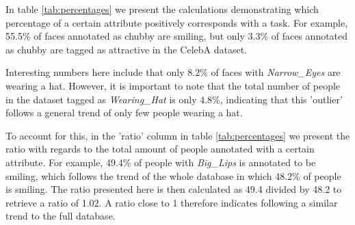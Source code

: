 In table \ref{tab:percentages} we present the calculations demonstrating which percentage of a certain attribute positively corresponds with a task. For example, 55.5\% of faces annotated as chubby are smiling, but only 3.3\% of faces annotated as chubby are tagged as attractive in the CelebA dataset. \newline

Interesting numbers here include that only 8.2\% of faces with \textit{Narrow\_Eyes} are wearing a hat. However, it is important to note that the total number of people in the dataset tagged as \textit{Wearing\_Hat} is only 4.8\%, indicating that this 'outlier' follows a general trend of only few people wearing a hat. \newline

To account for this, in the 'ratio' column in table \ref{tab:percentages} we present the ratio with regards to the total amount of people annotated with a certain attribute. For example, 49.4\% of people with \textit{Big\_Lips} is annotated to be smiling, which follows the trend of the whole database in which 48.2\% of people is smiling. The ratio presented here is then calculated as 49.4 divided by 48.2 to retrieve a ratio of 1.02. A ratio close to 1 therefore indicates following a similar trend to the full database.

